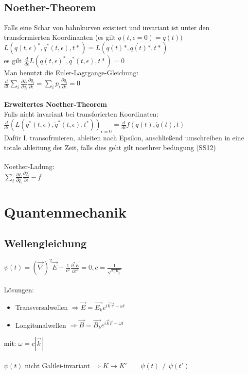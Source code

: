\documentclass[10pt,a4paper]{article}
\begin{document}
\subsection{Noether-Theorem}
Falls eine Schar von bahnkurven existiert und invariant ist unter den transformierten Koordinanten (es gilt $q(t,\epsilon=0)=q(t))$\\
%
$L(q(t,\epsilon)^*,\dot{q}^*(t,\epsilon),t*)  =  L(q(t)*,\dot{q(t)}*,t*)$\\
es gilt $\frac{d}{d \epsilon} L(q(t,\epsilon)^*,\dot{q}^*(t,\epsilon),t*)=0$\\
Man benutzt die Euler-Lagrgange-Gleichung:\\
$\frac{d}{dt}\sum_i \frac{\partial{L}}{\partial \dot{q}_i} \frac{\partial{q_i}}{\partial \epsilon} = \sum_i p_i \frac{\partial{q_i}}{\partial \epsilon} = 0$\\
%
\\
\textbf{Erweitertes Noether-Theorem}\\
Falls nicht invariant bei transforierten Koordinaten:\\
$\frac{d }{d \epsilon} (L(q^*(t,\epsilon),\dot{q}^*(t,\epsilon),t^*))_{\epsilon=0}  =  \frac{d }{d t} f(q(t),\dot{q}(t),t)$\\
Dafür L transofrmieren, ableiten nach Epsilon, anschließend umschreiben in eine totale ableitung der Zeit, falls dies geht gilt noethrer bedingung (SS12)\\
%
\\
Noether-Ladung:\\
$\sum_i \frac{\partial{L}}{\partial \dot{q}_i} \frac{\partial{q_i}}{\partial \epsilon
} - f$

\section{Quantenmechanik}

\subsection{Wellengleichung}
$\psi(t)=(\vec{\nabla})^2\vec{E}-\frac{1}{c^2}\frac{\partial^2 \vec{E}}{\partial t^2}=0, c=\frac{1}{\sqrt{\varepsilon_0\mu_0}}$\\
%
\\
Lösungen:
\begin{itemize}
\item Transversalwellen $\Rightarrow \vec{E}= \vec{E_k}e^{i\vec{k}\vec{r}-\omega t}$\\
\item Longitunalwellen $\Rightarrow \vec{B}=\vec{B_k}e^{i\vec{k}\vec{r}-\omega t}$\\
\end{itemize}
mit: $\omega = c|\vec{k}|$\\
%
\\
$\psi(t)$ nicht Galilei-invariant $\Rightarrow K \rightarrow K'\qquad \psi(t) \neq\psi(t')$\\
%
\end{document}
